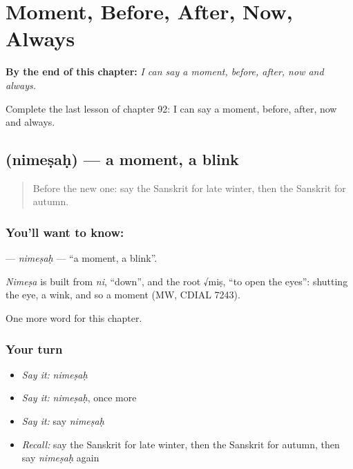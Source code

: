 
\chapter{Moment, Before, After, Now, Always}
\label{ch:sa-moment-before-after-now-always}

\begin{chapteropening}
\textbf{By the end of this chapter:} \emph{I can say a moment, before, after, now and always.}

Complete the last lesson of chapter 92: I can say a moment, before, after, now and always.
\end{chapteropening}

\section[\texorpdfstring{\sk{निमेषः} (nimeṣaḥ)}{निमेषः (nimeṣaḥ)}]{ (nimeṣaḥ) — a moment, a blink}

\label{lesson:SA-C92-nimesah}



\begin{quote}
Before the new one: say the Sanskrit for late winter, then the Sanskrit for autumn.
\end{quote}

\subsection*{You'll want to know: }
\textbf{} — \emph{nimeṣaḥ} — \textquotedblleft{}a moment, a blink\textquotedblright{}.

\begin{cousinweb}
\emph{Nimeṣa} is built from \emph{ni}, \textquotedblleft{}down\textquotedblright{}, and the root √miṣ, \textquotedblleft{}to open the eyes\textquotedblright{}: shutting the eye, a wink, and so a moment (MW, CDIAL 7243).
\end{cousinweb}

\begin{grammarlens}[title={What you've built}]
One more word for this chapter.
\end{grammarlens}

\subsection*{Your turn}
\begin{itemize}
\raggedright
  \item \emph{Say it:} \emph{nimeṣaḥ}
  \item \emph{Say it:} \emph{nimeṣaḥ}, once more
  \item \emph{Say it:} say \emph{nimeṣaḥ}
  \item \emph{Recall:} say the Sanskrit for late winter, then the Sanskrit for autumn, then say \emph{nimeṣaḥ} again
\end{itemize}

